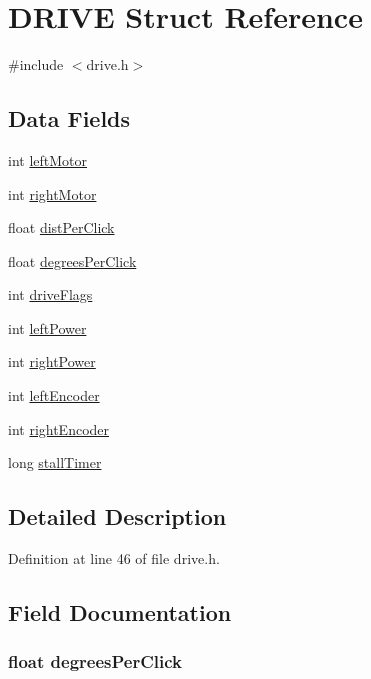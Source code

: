 \hypertarget{struct_d_r_i_v_e}{
\section{DRIVE Struct Reference}
\label{struct_d_r_i_v_e}
}


{\ttfamily \#include $<$drive.h$>$}

\subsection*{Data Fields}
\begin{DoxyCompactItemize}
\item 
int \hyperlink{struct_d_r_i_v_e_aaf76718632f46504ae116a755a231698}{leftMotor}
\item 
int \hyperlink{struct_d_r_i_v_e_a8235d58dd2708fea5e5f54475362bf77}{rightMotor}
\item 
float \hyperlink{struct_d_r_i_v_e_ae00ce968ccc79179365d3e1391cd1e74}{distPerClick}
\item 
float \hyperlink{struct_d_r_i_v_e_aa156c3fb60cfac80602ccc58c7634ca0}{degreesPerClick}
\item 
int \hyperlink{struct_d_r_i_v_e_adda084ef25108fe61f2fe58d0ebd809e}{driveFlags}
\item 
int \hyperlink{struct_d_r_i_v_e_a858af4a4b363a1ba3d939ea4207ff2f0}{leftPower}
\item 
int \hyperlink{struct_d_r_i_v_e_a957fe120aeb90451719fa94ad0cb552d}{rightPower}
\item 
int \hyperlink{struct_d_r_i_v_e_a85b2a8a5c3d01c5c110092daf8b72db3}{leftEncoder}
\item 
int \hyperlink{struct_d_r_i_v_e_a529a20307b64e9793dbe0630b0381ba0}{rightEncoder}
\item 
long \hyperlink{struct_d_r_i_v_e_a753e55872364cf5e6ab6968b26e23ca7}{stallTimer}
\end{DoxyCompactItemize}


\subsection{Detailed Description}


Definition at line 46 of file drive.h.



\subsection{Field Documentation}
\hypertarget{struct_d_r_i_v_e_aa156c3fb60cfac80602ccc58c7634ca0}{
\subsubsection[{degreesPerClick}]{\setlength{\rightskip}{0pt plus 5cm}float {\bf degreesPerClick}}}
\label{struct_d_r_i_v_e_aa156c3fb60cfac80602ccc58c7634ca0}


